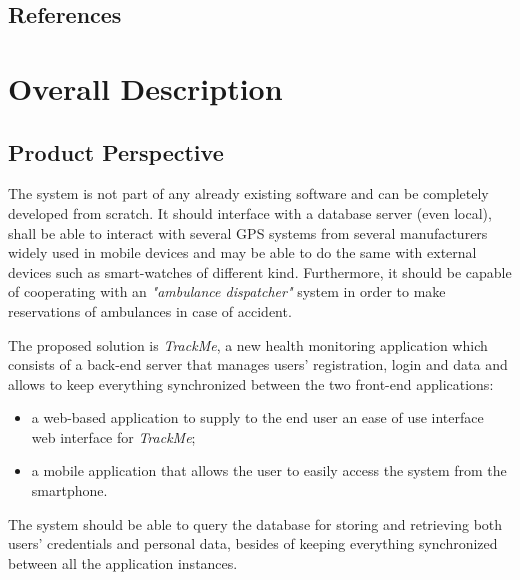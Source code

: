 \documentclass[a4paper]{article}
\begin{document}
    \subsection{References}
        \printbibliography[heading=none]
\newpage
\section{Overall Description}
    \subsection{Product Perspective}
    
    The system is not part of any already existing software and can be completely developed from scratch. It should interface with a database server (even local), shall be able to interact with several GPS systems from several manufacturers widely used in mobile devices and may be able to do the same with external devices such as smart-watches of different kind. Furthermore, it should be capable of cooperating with an \textit{"ambulance dispatcher"} system in order to make reservations of ambulances in case of accident.
    
    The proposed solution is \textit{TrackMe}, a new health monitoring application which consists of a back-end server that manages users' registration, login and data and allows to keep everything synchronized between the two front-end applications:
        \begin{itemize}
            \item a web-based application to supply to the end user an ease of use interface web interface for \textit{TrackMe};
            \item a mobile application that allows the user to easily access the system from the smartphone.
        \end{itemize}
    
    The system should be able to query the database for storing and retrieving both users' credentials and personal data, besides of keeping everything synchronized between all the application instances.
    
    \newpage
\end{document}

